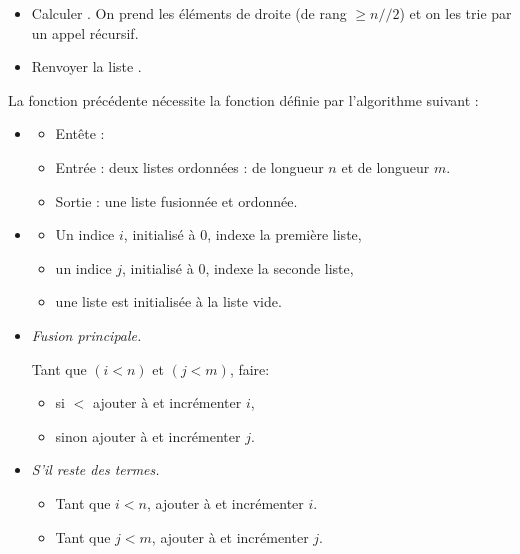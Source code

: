\documentclass[11pt,class=report,crop=false]{standalone}
\begin{document}
\begin{activite}
\begin{algorithme}
\begin{itemize}
		\item Calculer . On prend les éléments de droite (de rang $\ge n//2$) et on les trie par un appel récursif.
		
		\item Renvoyer la liste .
		
	\end{itemize}
\end{algorithme} 

	La fonction précédente nécessite la fonction définie par l'algorithme suivant :
		\begin{algorithme}
		\sauteligne 
		
		\begin{itemize}
			\item 
			\begin{itemize}
				\item Entête :  
				\item Entrée : deux listes ordonnées :  de longueur $n$ et  de longueur $m$.			
				\item Sortie : une liste fusionnée et ordonnée.				
			\end{itemize}
			
			\item 
			\begin{itemize}
				\item Un indice $i$, initialisé à $0$, indexe la première liste, 
				\item un indice $j$, initialisé à $0$, indexe la seconde liste,
				\item une liste  est initialisée à la liste vide.
			\end{itemize} 
			
			\item \emph{Fusion principale.}
			
			Tant que $(i < n)$ et $(j < m)$, faire:
			\begin{itemize}
				\item si  $<$  ajouter   à  et incrémenter $i$,
				\item sinon  ajouter   à  et incrémenter $j$.
			\end{itemize} 	
			\item \emph{S'il reste des termes.}
			\begin{itemize}
			  \item Tant que $i < n$, ajouter   à  et incrémenter $i$.
			  \item Tant que $j < m$, ajouter   à  et incrémenter $j$.	
			\end{itemize} 			
			

\end{itemize}
\end{algorithme}
\end{activite}
\end{document}
